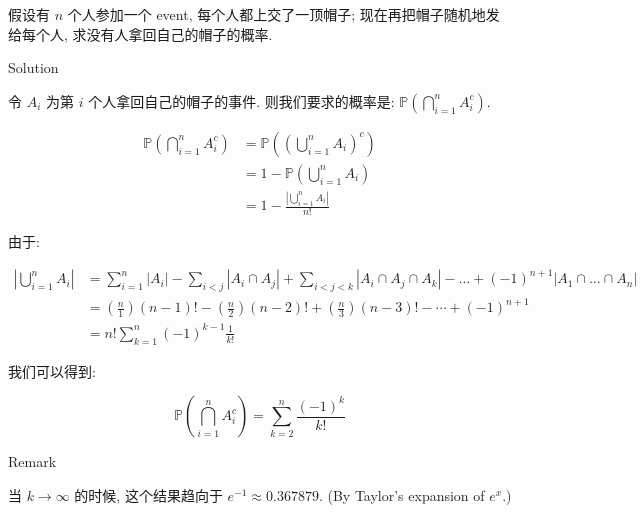 \documentclass{qlnotes-export}
\begin{document}
\begin{example}\label{ex-01-combinatorics-prob-space-matching-problem}

假设有 \(n\) 个人参加一个 event, 每个人都上交了一顶帽子; 现在再把帽子随机地发给每个人, 求没有人拿回自己的帽子的概率.

\begin{qlsolution}{Solution}

令 \(A_{i}\) 为第 \(i\) 个人拿回自己的帽子的事件. 则我们要求的概率是: \({\mathbb{P}}(\bigcap_{i = 1}^{n}A_{i}^{c})\).

\[\begin{matrix}
{{\mathbb{P}}(\bigcap\limits_{i = 1}^{n}A_{i}^{c})} & {= {\mathbb{P}}((\bigcup\limits_{i = 1}^{n}A_{i})^{c})} \\
 & {= 1 - {\mathbb{P}}(\bigcup\limits_{i = 1}^{n}A_{i})} \\
 & {= 1 - \frac{|\bigcup_{i = 1}^{n}A_{i}|}{n!}}
\end{matrix}\]

由于:

\[\begin{matrix}
{|\bigcup\limits_{i = 1}^{n}A_{i}|} & {= \sum\limits_{i = 1}^{n}\left| A_{i} \right| - \sum\limits_{i < j}\left| {A_{i} \cap A_{j}} \right| + \sum\limits_{i < j < k}\left| {A_{i} \cap A_{j} \cap A_{k}} \right| - \ldots + ( - 1)^{n + 1}\left| {A_{1} \cap \ldots \cap A_{n}} \right|} \\
 & {= \left( \frac{n}{1} \right)(n - 1)! - \left( \frac{n}{2} \right)(n - 2)! + \left( \frac{n}{3} \right)(n - 3)! - \cdots + ( - 1)^{n + 1}} \\
 & {= n!\sum\limits_{k = 1}^{n}( - 1)^{k - 1}\frac{1}{k!}}
\end{matrix}\]

我们可以得到:

\[{\mathbb{P}}(\bigcap\limits_{i = 1}^{n}A_{i}^{c}) = \sum\limits_{k = 2}^{n}\frac{( - 1)^{k}}{k!}\]

\end{qlsolution}

\end{example}

\begin{qlremark}{Remark}

当 \(k\rightarrow\infty\) 的时候, 这个结果趋向于 \(e^{- 1} \approx 0.367879\). (By Taylor's expansion of \(e^{x}\).)

\end{qlremark}
\end{document}
